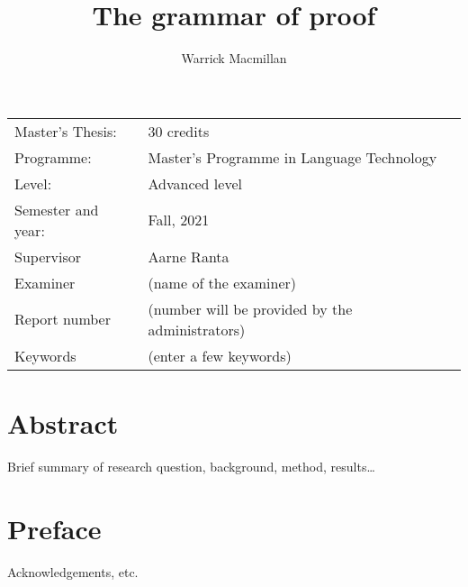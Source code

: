 \documentclass[11pt, a4paper]{article}
\title{The grammar of proof}
\author{Warrick Macmillan}
\begin{document}
\begin{titlepage}

\maketitle

\vfill

\begingroup
\renewcommand*{\arraystretch}{1.2}
\begin{tabular}{l@{\hskip 20mm}l}
\hline
Master's Thesis: & 30 credits\\
Programme: & Master’s Programme in Language Technology\\
Level: & Advanced level \\
Semester and year: & Fall, 2021\\
Supervisor & Aarne Ranta\\
Examiner & (name of the examiner)\\
Report number & (number will be provided by the administrators) \\
Keywords & (enter a few keywords) 
\end{tabular}
\endgroup

\thispagestyle{empty}
\end{titlepage}

\newpage
\singlespacing
\section*{Abstract}

Brief summary of research question, background, method, results\ldots

\thispagestyle{empty}

\newpage
\section*{Preface}

Acknowledgements, etc.

\thispagestyle{empty}

\newpage
\end{document}
